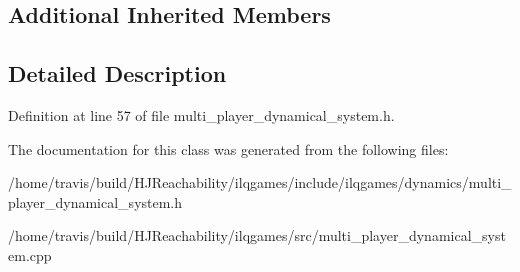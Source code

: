 \subsection*{Additional Inherited Members}


\subsection{Detailed Description}


Definition at line 57 of file multi\+\_\+player\+\_\+dynamical\+\_\+system.\+h.



The documentation for this class was generated from the following files\+:\begin{DoxyCompactItemize}
\item 
/home/travis/build/\+H\+J\+Reachability/ilqgames/include/ilqgames/dynamics/multi\+\_\+player\+\_\+dynamical\+\_\+system.\+h\item 
/home/travis/build/\+H\+J\+Reachability/ilqgames/src/multi\+\_\+player\+\_\+dynamical\+\_\+system.\+cpp\end{DoxyCompactItemize}
